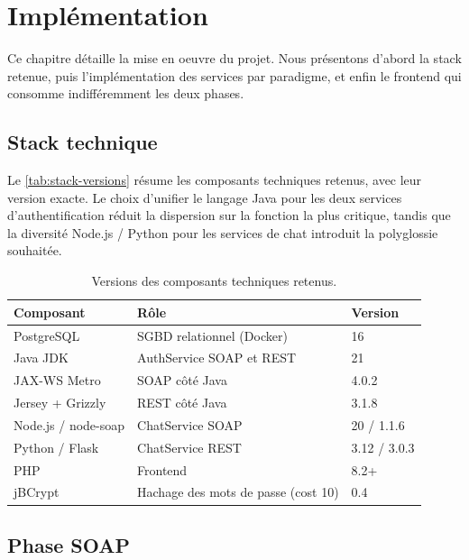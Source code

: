 \section{Implémentation}

Ce chapitre détaille la mise en oeuvre du projet. Nous présentons d'abord la stack retenue, puis l'implémentation des services par paradigme, et enfin le frontend qui consomme indifféremment les deux phases.

\subsection{Stack technique}

Le \autoref{tab:stack-versions} résume les composants techniques retenus, avec leur version exacte. Le choix d'unifier le langage Java pour les deux services d'authentification réduit la dispersion sur la fonction la plus critique, tandis que la diversité Node.js / Python pour les services de chat introduit la polyglossie souhaitée.

\begin{table}[H]
  \centering
  \caption{Versions des composants techniques retenus.}
  \label{tab:stack-versions}
  \begin{tabularx}{\linewidth}{l X l}
    \toprule
    \textbf{Composant} & \textbf{Rôle} & \textbf{Version} \\
    \midrule
    PostgreSQL          & SGBD relationnel (Docker)               & 16 \\
    Java JDK            & AuthService SOAP et REST                 & 21 \\
    JAX-WS Metro        & SOAP côté Java                          & 4.0.2 \\
    Jersey + Grizzly    & REST côté Java                          & 3.1.8 \\
    Node.js / node-soap & ChatService SOAP                        & 20 / 1.1.6 \\
    Python / Flask      & ChatService REST                        & 3.12 / 3.0.3 \\
    PHP                 & Frontend                                 & 8.2+ \\
    jBCrypt             & Hachage des mots de passe (cost 10)     & 0.4 \\
    \bottomrule
  \end{tabularx}
\end{table}

\subsection{Phase SOAP}


